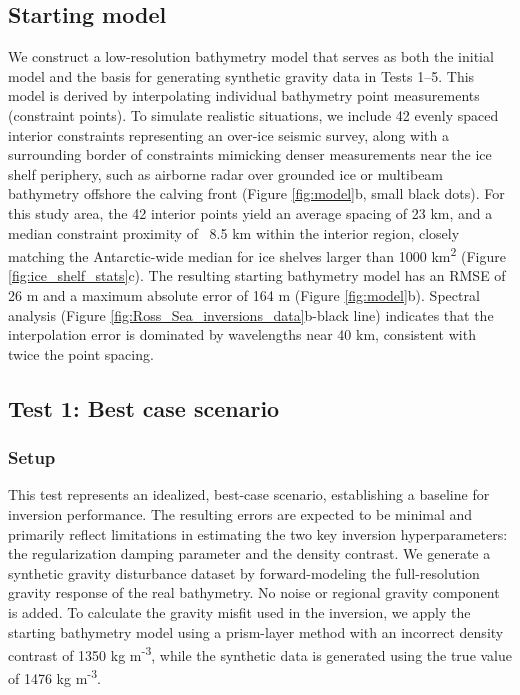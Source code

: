 \documentclass[tc, manuscript]{copernicus}
\begin{document}
\subsection{Starting model}
We construct a low-resolution bathymetry model that serves as both the initial model and the basis for generating synthetic gravity data in Tests 1–5. This model is derived by interpolating individual bathymetry point measurements (constraint points). To simulate realistic situations, we include 42 evenly spaced interior constraints representing an over-ice seismic survey, along with a surrounding border of constraints mimicking denser measurements near the ice shelf periphery, such as airborne radar over grounded ice or multibeam bathymetry offshore the calving front (Figure \ref{fig:model}b, small black dots). For this study area, the 42 interior points yield an average spacing of 23 km, and a median constraint proximity of ~8.5 km within the interior region, closely matching the Antarctic-wide median for ice shelves larger than 1000 km\textsuperscript{2} (Figure \ref{fig:ice_shelf_stats}c). The resulting starting bathymetry model has an RMSE of 26 m and a maximum absolute error of 164 m (Figure \ref{fig:model}b). Spectral analysis (Figure \ref{fig:Ross_Sea_inversions_data}b-black line) indicates that the interpolation error is dominated by wavelengths near 40 km, consistent with twice the point spacing.

\subsection{Test 1: Best case scenario}
\subsubsection{Setup}
This test represents an idealized, best-case scenario, establishing a baseline for inversion performance. The resulting errors are expected to be minimal and primarily reflect limitations in estimating the two key inversion hyperparameters: the regularization damping parameter and the density contrast. We generate a synthetic gravity disturbance dataset by forward-modeling the full-resolution gravity response of the real bathymetry. No noise or regional gravity component is added. To calculate the gravity misfit used in the inversion, we apply the starting bathymetry model using a prism-layer method with an incorrect density contrast of 1350 kg m\textsuperscript{-3}, while the synthetic data is generated using the true value of 1476 kg m\textsuperscript{-3}.
\end{document}
